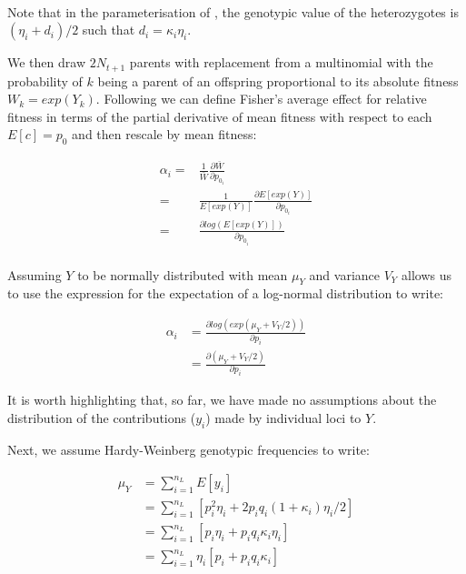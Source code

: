 \documentclass[12pt]{article}
\begin{document}
\begin{bibunit}
\begin{equation}
\begin{array}{rl}
\end{array} 
\end{equation}

Note that in the parameterisation of \citet{falconer1996}, the genotypic value of the heterozygotes is $(\eta_i + d_i)/2$ such that $d_i = \kappa_i \eta_i$.

 We then draw $2N_{t+1}$ parents with replacement from a multinomial with the   probability of $k$ being a parent of an offspring proportional to its absolute fitness  $W_k=exp(Y_k)$.  Following \citet{Kojima.1959} we can define Fisher's average effect for relative fitness in terms of the partial derivative of mean fitness with respect to each $E[c]=p_0$ and then rescale by mean fitness:

\begin{equation}
\begin{array}{rl}
\alpha_i =& \frac{1}{\bar W}\frac{\partial{\bar W}}{\partial{p_{0_i}}}\\
 =&  \frac{1}{E[exp(Y)]}\frac{\partial{E[exp(Y)]}}{\partial{p_{0_i}}}\\
  =&  \frac{\partial{log(E[exp(Y)])}}{\partial{p_{0_i}}}\\
\end{array}
\end{equation}

Assuming $Y$ to be normally distributed with mean ${\mu_Y}$ and variance $V_Y$ allows us to use the expression for the expectation of a log-normal distribution to write:

\begin{equation}
\begin{array}{rl}
\alpha_i&= \frac{\partial log(exp(\mu_Y + {V_Y}/2 ))}{\partial p_i} \\
&= \frac{\partial (\mu_Y + {V_Y}/2 )}{\partial p_{i}}
\end{array}
\end{equation}

It is worth highlighting that, so far, we have made no assumptions about the distribution of the contributions ($y_i$) made by individual loci to $Y$. 

Next, we assume Hardy-Weinberg genotypic frequencies to write:


\begin{equation}
\begin{array}{rl}
\mu_Y &= \sum_{i=1}^{n_L} E[y_{i}] \\
&=  \sum_{i=1}^{n_L} [p_i^2\eta_i + 2{p_i}{q_i}(1 + \kappa_i)\eta_i/2] \\
&= \sum_{i=1}^{n_L} [{p_i}{\eta_i} + p_iq_i\kappa_i \eta_i]\\
&= \sum_{i=1}^{n_L} \eta_i[{p_i} + p_iq_i\kappa_i]
\end{array}
\end{equation}


\end{bibunit}
\end{document}
